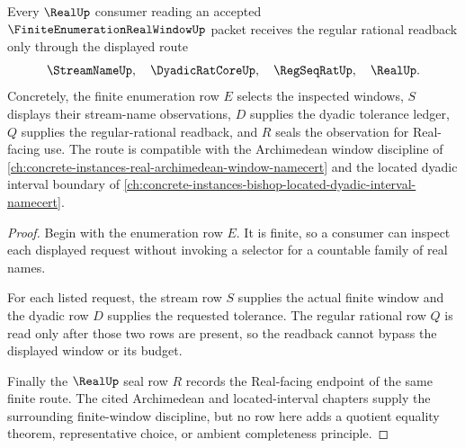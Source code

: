 \begin{theorem}
\label{thm:finite-enumeration-real-window-readback}
Every $\RealUp$ consumer reading an accepted $\FiniteEnumerationRealWindowUp$ packet receives the regular rational readback only through the displayed route
$$
\StreamNameUp,\quad \DyadicRatCoreUp,\quad \RegSeqRatUp,\quad \RealUp .
$$
Concretely, the finite enumeration row $E$ selects the inspected windows, $S$ displays their stream-name observations, $D$ supplies the dyadic tolerance ledger, $Q$ supplies the regular-rational readback, and $R$ seals the observation for Real-facing use. The route is compatible with the Archimedean window discipline of \autoref{ch:concrete-instances-real-archimedean-window-namecert} and the located dyadic interval boundary of \autoref{ch:concrete-instances-bishop-located-dyadic-interval-namecert}.
\end{theorem}
\begin{proof}
Begin with the enumeration row $E$. It is finite, so a consumer can inspect each displayed request without invoking a selector for a countable family of real names.

For each listed request, the stream row $S$ supplies the actual finite window and the dyadic row $D$ supplies the requested tolerance. The regular rational row $Q$ is read only after those two rows are present, so the readback cannot bypass the displayed window or its budget.

Finally the $\RealUp$ seal row $R$ records the Real-facing endpoint of the same finite route. The cited Archimedean and located-interval chapters supply the surrounding finite-window discipline, but no row here adds a quotient equality theorem, representative choice, or ambient completeness principle.
\end{proof}

